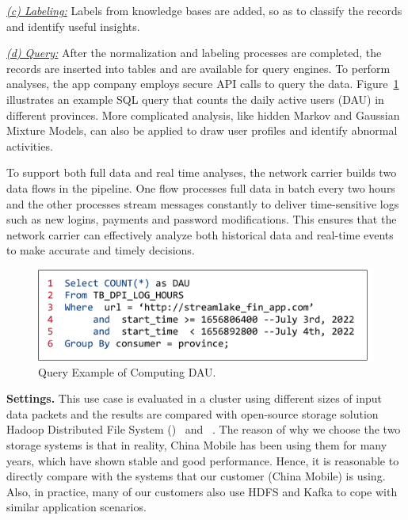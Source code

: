 \noindent \underline{\textit{(c) Labeling:}} Labels from knowledge bases are added, so as to classify the records and identify useful insights.

\noindent \underline{\textit{(d) Query:}} After the normalization and labeling processes are completed, the  records are inserted into tables and are available for query engines. To perform analyses, the app company employs secure API calls to query the data. Figure~\ref{exp:fig:sql} illustrates an example SQL query that counts the daily active users (DAU) in different provinces. More complicated analysis, like hidden Markov and Gaussian Mixture Models, can also be applied to draw user profiles and identify abnormal activities.

To support both full data and real time analyses, the network carrier builds two data flows in the pipeline. One flow processes full data in batch every two hours and the other processes stream messages constantly to deliver time-sensitive logs such as new logins, payments and password modifications. This ensures that the network carrier can effectively analyze both historical data and real-time events to make  accurate and timely decisions.

 \begin{figure}[htbp]
	\includegraphics[scale=0.33]{figures/sql}
	\centering
	\vspace{-1.3em}
	\caption{Query Example of Computing DAU.}
	\label{exp:fig:sql}
	\vspace{-2em}
\end{figure}

\noindent \textbf{Settings.} This use case is evaluated in a  cluster using different sizes of input data packets and the results are compared with open-source storage solution Hadoop Distributed File System (\hdfs)~\cite{hdfs} and \kafka~\cite{kafka}. The reason of why we choose the two storage systems is that in reality, China Mobile has been using them for many years, which have shown stable and good performance. Hence, it is  reasonable to directly compare with the systems that our customer (China Mobile) is using. Also, in practice, many of our customers also use HDFS and Kafka to cope with similar application scenarios.


